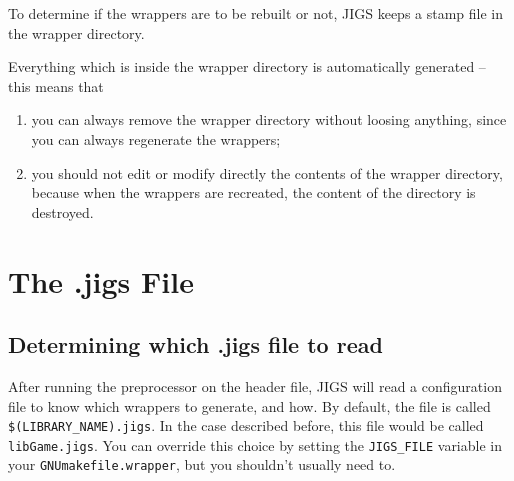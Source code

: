 To determine if the wrappers are to be rebuilt or not, JIGS keeps a
stamp file in the wrapper directory.

Everything which is inside the wrapper directory is automatically
generated -- this means that
\begin{enumerate}
\item you can always remove the wrapper directory without loosing anything, 
since you can always regenerate the wrappers;
\item you should not edit or modify directly the contents of the wrapper 
directory, because when the wrappers are recreated, the content of the 
directory is destroyed.
\end{enumerate}

\section{The .jigs File}

\subsection{Determining which .jigs file to read}
After running the preprocessor on the header file, JIGS will read a
configuration file to know which wrappers to generate, and how.  By
default, the file is called \texttt{\$(LIBRARY\_NAME).jigs}.  In the
case described before, this file would be called
\texttt{libGame.jigs}.  You can override this choice by setting the
\texttt{JIGS\_FILE} variable in your \texttt{GNUmakefile.wrapper}, 
but you shouldn't usually need to.

